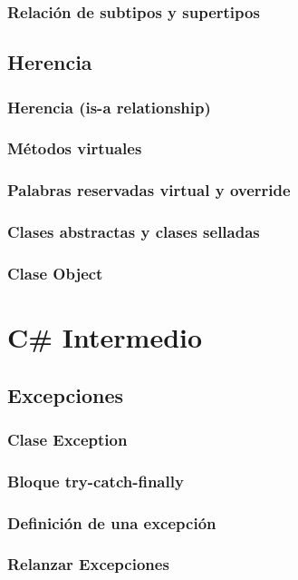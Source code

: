 \documentclass[12pt,a4paper]{report}
\begin{document}
\section{Relación de subtipos y supertipos}

\chapter{Herencia}
\section{Herencia (is-a relationship)}
\section{Métodos virtuales}
\section{Palabras reservadas virtual y override}
\section{Clases abstractas y clases selladas}
\section{Clase Object}

\part{C\# Intermedio}

\chapter{Excepciones}
\section{Clase Exception}
\section{Bloque try-catch-finally}
\section{Definición de una excepción}
\section{Relanzar Excepciones}
\end{document}
